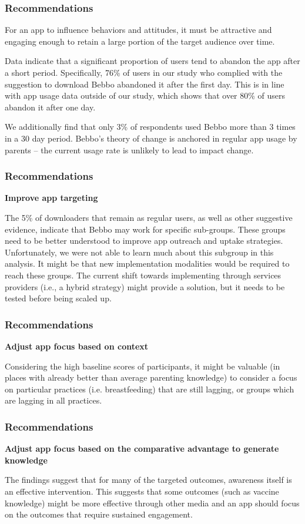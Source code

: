 \documentclass[aspectratio=169]{beamer}
\begin{document}
\begin{frame}
   \frametitle{Recommendations}

For an app to influence behaviors and attitudes, it must be attractive and engaging enough to retain a large portion of the target audience over time. 

Data indicate that a significant proportion of users tend to abandon the app after a short period. Specifically, 76\% of users in our study who complied with the suggestion to download Bebbo abandoned it after the first day. This is in line with app usage data outside of our study, which shows that over 80\% of users abandon it after one day. 

We additionally find that only 3\% of respondents used Bebbo more than 3 times in a 30 day period. Bebbo’s theory of change is anchored in regular app usage by parents – the current usage rate is unlikely to lead to impact change.

\end{frame}

\begin{frame}
   \frametitle{Recommendations}

\textbf{Improve app targeting}

The 5\% of downloaders that remain as regular users, as well as other suggestive evidence, indicate that Bebbo may work for specific sub-groups. These groups need to be better understood to improve app outreach and uptake strategies. Unfortunately, we were not able to learn much about this subgroup in this analysis. It might be that new implementation modalities would be required to reach these groups. The current shift towards implementing through services providers (i.e., a hybrid strategy) might provide a solution, but it needs to be tested before being scaled up.  

\end{frame}

\begin{frame}
   \frametitle{Recommendations}

\textbf{Adjust app focus based on context}

Considering the high baseline scores of participants, it might be valuable (in places with already better than average parenting knowledge) to consider a focus on particular practices (i.e. breastfeeding) that are still lagging, or groups which are lagging in all practices. 
\end{frame}

\begin{frame}
   \frametitle{Recommendations}
 

\textbf{Adjust app focus based on the comparative advantage to generate knowledge}

The findings suggest that  for many of the targeted outcomes, awareness itself is an effective intervention. This suggests that some outcomes (such as vaccine knowledge) might be more effective through other media and an app should focus on the outcomes that require sustained engagement. 
\end{frame}
\end{document}
